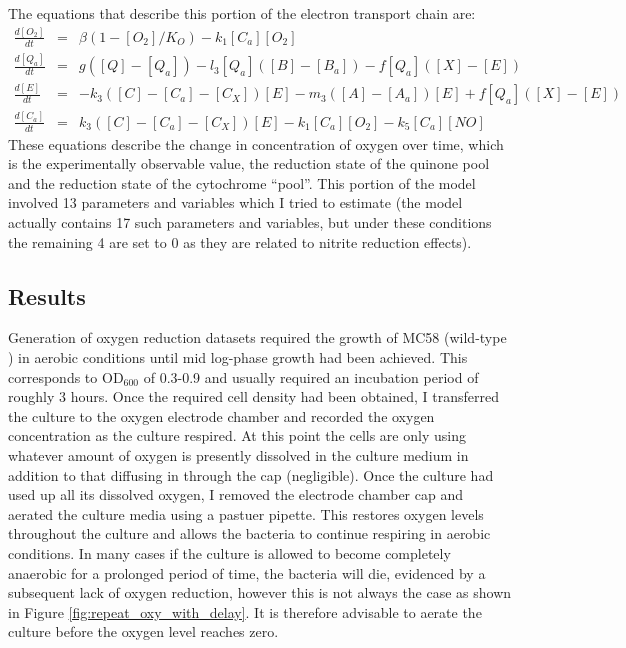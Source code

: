 The equations that describe this portion of the electron transport chain are:
\begin{eqnarray*}
\frac{d[O_2]}{dt} & = & \beta(1-[O_2]/K_O) - k_{1}[C_a][O_2]\\
\frac{d[Q_a]}{dt} & = & g([Q] - [Q_a]) - l_3[Q_a]([B] - [B_a]) - f[Q_a]([X]-[E])\\
\frac{d[E]}{dt} & = & -k_3([C] - [C_a] - [C_X])[E]  - m_3([A] - [A_a])[E] + f[Q_a]([X]-[E])\\
\frac{d[C_a]}{dt} & = & k_3([C] - [C_a] - [C_X])[E] - k_{1}[C_a][O_2] - k_5[C_a][NO]
\end{eqnarray*}
These equations describe the change in concentration of oxygen over time, which is the experimentally observable value, the reduction state of the quinone pool and the reduction state of the cytochrome ``pool''. This portion of the model involved 13 parameters and variables which I tried to estimate (the model actually contains 17 such parameters and variables, but under these conditions the remaining 4 are set to 0 as they are related to nitrite reduction effects).

\subsection{Results}

Generation of oxygen reduction datasets required the growth of MC58 (wild-type \Nsm{}) in aerobic conditions until mid log-phase growth had been achieved. This corresponds to $\mathrm{OD}_{600}$ of 0.3-0.9 and usually required an incubation period of roughly 3 hours. Once the required cell density had been obtained, I transferred the culture to the oxygen electrode chamber and recorded the oxygen concentration as the culture respired. At this point the cells are only using whatever amount of oxygen is presently dissolved in the culture medium in addition to that diffusing in through the cap (negligible). Once the culture had used up all its dissolved oxygen, I removed the electrode chamber cap and aerated the culture media using a pastuer pipette. This restores oxygen levels throughout the culture and allows the bacteria to continue respiring in aerobic conditions. In many cases if the culture is allowed to become completely anaerobic for a prolonged period of time, the bacteria will die, evidenced by a subsequent lack of oxygen reduction, however this is not always the case as shown in Figure \ref{fig:repeat_oxy_with_delay}. It is therefore advisable to aerate the culture before the oxygen level reaches zero.


